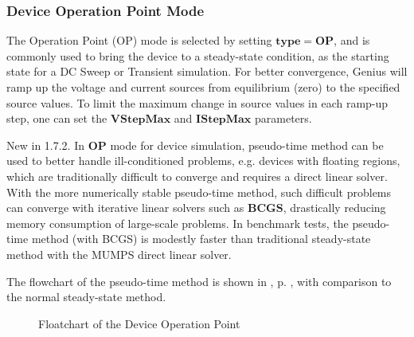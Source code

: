 \documentclass[oneside,12pt]{cgd_book}
\begin{document}
\subsubsection{Device Operation Point Mode}
The Operation Point (OP) mode is selected by setting $\mathbf{type=OP}$, and is commonly
          used to bring the device to a steady-state condition, as the starting state for a DC Sweep or Transient
          simulation. For better convergence, Genius will ramp up the voltage and current sources from equilibrium
          (zero) to the specified source values. To limit the maximum change in source values in each ramp-up step, one
          can set the $\mathbf{VStepMax}$ and $\mathbf{IStepMax}$
parameters.
\par
{}New in 1.7.2. In $\mathbf{OP}$ mode for device simulation, pseudo-time method can be used
            to better handle ill-conditioned problems, e.g. devices with floating regions, which are traditionally
            difficult to converge and requires a direct linear solver. With the more numerically stable pseudo-time
            method, such difficult problems can converge with iterative linear solvers such as
$\mathbf{BCGS}$, drastically reducing memory consumption of large-scale problems. In benchmark
            tests, the pseudo-time method (with BCGS) is modestly faster than traditional steady-state method with the
            MUMPS direct linear solver.
\par
\par
The flowchart of the pseudo-time method is shown in ,
p. \pageref{fig:CmdRef:SolveOP:flowchart},
          with comparison to the normal steady-state method.
\par
\begin{figure}[H]
\caption{\label{fig:CmdRef:SolveOP:flowchart}Floatchart of the Device Operation Point}
\end{figure}
\end{document}
